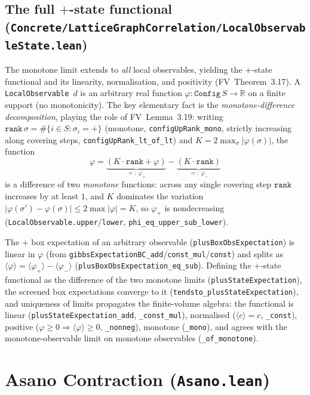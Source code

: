 \documentclass[a4paper,11pt]{article}
\begin{document}
\subsection{The full $+$-state functional
(\texttt{Concrete/LatticeGraphCorrelation/LocalObservableState.lean})}

The monotone limit extends to \emph{all} local observables, yielding the
$+$-state functional and its linearity, normalisation, and positivity
(FV~Theorem~3.17).  A \texttt{LocalObservable}~$d$ is an arbitrary real function
$\varphi : \texttt{Config}\,S \to \mathbb R$ on a finite support (no
monotonicity).  The key elementary fact is the \emph{monotone-difference
decomposition}, playing the role of FV~Lemma~3.19: writing
$\texttt{rank}\,\sigma = \#\{i \in S : \sigma_i = +\}$ (monotone,
\texttt{configUpRank\_mono}, strictly increasing along covering steps,
\texttt{configUpRank\_lt\_of\_lt}) and $K = 2\max_\sigma |\varphi(\sigma)|$, the
function
\[
  \varphi = \underbrace{(K\cdot\texttt{rank} + \varphi)}_{=:~\varphi_+}
            - \underbrace{(K\cdot\texttt{rank})}_{=:~\varphi_-}
\]
is a difference of two \emph{monotone} functions: across any single covering step
$\texttt{rank}$ increases by at least $1$, and $K$ dominates the variation
$|\varphi(\sigma') - \varphi(\sigma)| \le 2\max|\varphi| = K$, so $\varphi_+$ is
nondecreasing (\texttt{LocalObservable.upper}/\texttt{lower},
\texttt{phi\_eq\_upper\_sub\_lower}).

The $+$ box expectation of an arbitrary observable
(\texttt{plusBoxObsExpectation}) is linear in $\varphi$ (from
\texttt{gibbsExpectationBC\_add}/\texttt{const\_mul}/\texttt{const}) and splits as
$\langle\varphi\rangle = \langle\varphi_+\rangle - \langle\varphi_-\rangle$
(\texttt{plusBoxObsExpectation\_eq\_sub}).  Defining the $+$-state functional as
the difference of the two monotone limits
(\texttt{plusStateExpectation}), the screened box expectations converge to it
(\texttt{tendsto\_plusStateExpectation}), and uniqueness of limits propagates the
finite-volume algebra: the functional is linear
(\texttt{plusStateExpectation\_add}, \texttt{\_const\_mul}), normalised
($\langle c\rangle = c$, \texttt{\_const}), positive
($\varphi \ge 0 \Rightarrow \langle\varphi\rangle \ge 0$, \texttt{\_nonneg}),
monotone (\texttt{\_mono}), and agrees with the monotone-observable limit on
monotone observables (\texttt{\_of\_monotone}).

\section{Asano Contraction (\texttt{Asano.lean})}
\end{document}
